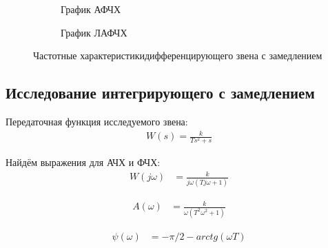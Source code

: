 \documentclass[a4paper, 12pt]{article}
\begin{document}
\begin{figure}[h!]
    \begin{subfigure}{0.5\textwidth}
        \centering
        \caption{График АФЧХ}
    \end{subfigure}
    \begin{subfigure}{0.5\textwidth}
        \centering
        \caption{График ЛАФЧХ}
    \end{subfigure}
    \caption{Частотные характеристикидифференцирующего звена с замедлением}
\end{figure}

\newpage
\begin{center}
	\section{Исследование интегрирующего с замедлением }
\end{center}

\par 
Передаточная функция исследуемого звена:
\begin{align}
	W(s)=\frac{k}{Ts^2 + s}
\end{align}
\par 
Найдём выражения для АЧХ и ФЧХ:
\begin{align}
	W(j\omega) & = \frac{k}{j\omega(Tj\omega+1)}
\end{align}

\begin{align}
	A(\omega) & = \frac{k}{\omega(T^2\omega^2+1 )}
\end{align}

\begin{align}
\psi(\omega) & = -\pi/2-arctg(\omega T)
\end{align}
\end{document}
